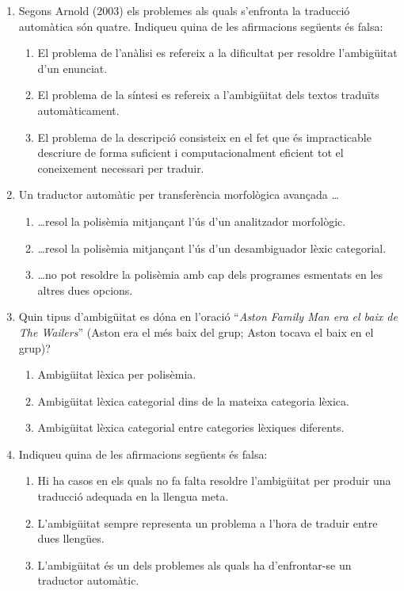 \begin{enumerate}
\item Segons Arnold (2003) els problemes als quals s'enfronta la
  traducció automàtica són quatre. Indiqueu quina de les afirmacions
  següents és falsa:
  \begin{enumerate}
  \item El problema de l'anàlisi es refereix a la dificultat per
    resoldre l'ambigüitat d'un enunciat.
  \item El problema de la síntesi es refereix a l'ambigüitat dels
    textos traduïts automàticament.
  \item El problema de la descripció consisteix en el fet que és
    impracticable descriure de forma suficient i computacionalment
    eficient tot el coneixement necessari per traduir.
  \end{enumerate}

\item Un traductor automàtic per transferència morfològica avançada
  \ldots 
  \begin{enumerate}
  \item \ldots resol la polisèmia mitjançant l'ús d'un analitzador
    morfològic.
  \item \ldots resol la polisèmia mitjançant l'ús d'un desambiguador
    lèxic categorial.
  \item \ldots no pot resoldre la polisèmia amb cap dels programes
    esmentats en les altres dues opcions.
  \end{enumerate}

\item Quin tipus d'ambigüitat es dóna en l'oració ``\emph{Aston Family
    Man era el baix de The Wailers}'' (Aston era el més baix del grup;
  Aston tocava el baix en el grup)? 
  \begin{enumerate}
  \item Ambigüitat lèxica per polisèmia.
  \item Ambigüitat lèxica categorial dins de la mateixa categoria
    lèxica.
  \item Ambigüitat lèxica categorial entre categories lèxiques
    diferents.
  \end{enumerate}

\item Indiqueu quina de les afirmacions següents és falsa:
  \begin{enumerate}
  \item Hi ha casos en els quals no fa falta resoldre l'ambigüitat per
    produir una traducció adequada en la llengua meta.
  \item L'ambigüitat sempre representa un problema a l'hora de
    traduir entre dues llengües.
  \item L'ambigüitat és un dels problemes als quals ha d'enfrontar-se
    un traductor automàtic.
  \end{enumerate}
\end{enumerate}

